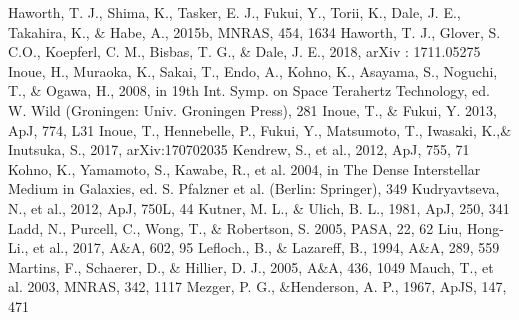 \documentclass[onecolumn]{pasj01}
\begin{document}
{{{{{{\begin{thebibliography}{}
Haworth, T. J., Shima, K., Tasker, E. J., Fukui, Y., Torii, K., Dale, J. E., Takahira, K., \& Habe, A., 2015b, MNRAS, 454, 1634
{Haworth, T. J., Glover, S. C.O., Koepferl, C. M., Bisbas, T. G., \& Dale, J. E., 2018, arXiv : 1711.05275}
Inoue, H., Muraoka, K., Sakai, T., Endo, A., Kohno, K., Asayama, S., Noguchi, T., \& Ogawa, H., 2008, in 19th Int. Symp. on Space Terahertz Technology, ed. W. Wild (Groningen: Univ. Groningen Press), 281
Inoue, T., \& Fukui, Y. 2013, ApJ, 774, L31
{ Inoue, T., Hennebelle, P., Fukui, Y., Matsumoto, T., Iwasaki, K.,\& Inutsuka, S., 2017, arXiv:170702035}
Kendrew, S., et al., 2012, ApJ, 755, 71
Kohno, K., Yamamoto, S., Kawabe, R., et al. 2004, in The Dense Interstellar Medium in Galaxies, ed. S. Pfalzner et al. (Berlin: Springer), 349
Kudryavtseva, N., et al., 2012, ApJ, 750L, 44
{ Kutner, M. L., \& Ulich, B. L., 1981, ApJ, 250, 341}
Ladd, N., Purcell, C., Wong, T., \& Robertson, S. 2005, PASA, 22, 62
Liu, Hong-Li., et al.,  2017, A\&A, 602, 95
Lefloch., B., \& Lazareff, B., 1994, A\&A, 289, 559 
Martins, F., Schaerer, D., \& Hillier, D. J., 2005, A\&A, 436, 1049
{Mauch, T., et al. 2003, MNRAS, 342, 1117}
Mezger, P. G., \&Henderson, A. P., 1967, ApJS, 147, 471

\end{thebibliography}}}}}}}
\end{document}
